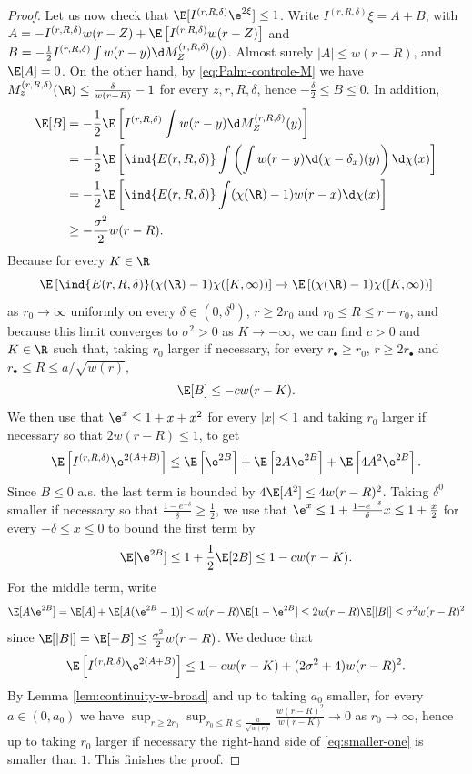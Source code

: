 \documentclass[10pt,a4paper]{article}
\begin{document}
\begin{proof}
Let us now check that $\E[I^{(r,R,\delta)} \e^{2\xi}] \leq 1$. Write $I^{(r,R,\delta)}\xi = A + B$, with $A = -I^{(r,R,\delta)} w(r-Z) + \E\left[I^{(r,R,\delta)} w(r-Z)\right] $ and $B = - \frac{1}{2} I^{(r,R,\delta)} \int w(r-y) \d M_Z^{(r,R,\delta)}(y)$. Almost surely $|A| \leq w(r-R)$, and $\E[A]=0$. On the other hand, by \eqref{eq:Palm-controle-M} we have $M_z^{(r,R,\delta)}(\R) \leq \frac{\delta}{w(r-R)}-1$ for every $z, r, R, \delta$, hence $-\frac\delta 2 \leq B\leq 0$. 
In addition, 
\begin{align*}
\E[B] &= -\frac{1}{2}\E\left[ I^{(r,R,\delta)} \int w(r-y) \d M_Z^{(r,R,\delta)}(y) \right] \\
&= - \frac{1}{2} \E\left[ \ind{E(r,R,\delta)} \int \left(\int w(r-y) \d(\chi-\delta_x)(y)\right) \d\chi(x) \right] \\
&= - \frac{1}{2} \E\left[ \ind{E(r,R,\delta)} \int (\chi(\R)-1) w(r-x) \d\chi(x) \right] \\
&\geq -\frac{\sigma^2}{2}w(r-R) .
\end{align*}
Because for every $K\in\R$
\[ \E\left[ \ind{E(r,R,\delta)} (\chi(\R)-1) \chi([K, \infty)) \right] \to \E\left[ (\chi(\R)-1) \chi([K,\infty)) \right] \]
as $r_0\to\infty$ uniformly on every $\delta \in (0,\delta^0)$, $r\geq 2r_0$ and $r_0 \leq R \leq r-r_0$, and because this limit converges to $\sigma^2>0$ as $K\to-\infty$, we can find $c>0$ and $K\in\R$ such that, taking $r_0$ larger if necessary, for every $r_\bullet \geq r_0$, $r\geq 2r_\bullet$ and $r_\bullet \leq R \leq a/\sqrt{w(r)}$, 
\[ \E[B] \leq - c w(r-K) . \]
We then use that $\e^{x} \leq 1 + x + x^2$ for every $|x|\leq 1$ and taking $r_0$ larger if necessary so that $2w(r-R) \leq 1$, to get
\begin{align*}
\E\left[ I^{(r,R,\delta)} \e^{2(A+B)} \right] \leq \E\left[\e^{2B}\right] + \E\left[2A \e^{2B}\right] + \E\left[4A^2 \e^{2B} \right] .
\end{align*}
Since $B\leq 0$ a.s. the last term is bounded by $4\E[A^2] \leq 4 w(r-R)^2$. Taking $\delta^0$ smaller if necessary so that $\frac{1-e^{-\delta}}{\delta} \geq \frac 12$, we use that $\e^{x} \leq 1 + \frac{1-e^{-\delta}}{\delta} x \leq 1 + \frac{x}{2}$ for every $-\delta \leq x \leq 0$ to bound the first term by
\[ \E[\e^{2B}] \leq 1 + \frac{1}{2} \E[2B] \leq 1 - c w(r-K) . \]
For the middle term, write 
\[ \E[A\e^{2B}] = \E[A] + \E[A(\e^{2B}-1)] \leq w(r-R) \E[1-\e^{2B}] \leq 2w(r-R) \E[|B|] \leq \sigma^2 w(r-R)^2 \]
since $\E[|B|] = \E[-B] \leq \frac{\sigma^2}{2}w(r-R)$. We deduce that
\begin{equation}\label{eq:smaller-one}
\E\left[ I^{(r,R,\delta)} \e^{2(A+B)} \right] \leq 1 - c w(r-K) + (2\sigma^2 + 4) w(r-R)^2 .
\end{equation}
By Lemma \ref{lem:continuity-w-broad} and up to taking $a_0$ smaller, for every $a \in (0,a_0)$ we have $\sup_{r\geq 2r_0} \sup_{r_0\leq R \leq \frac{a}{\sqrt{w(r)}}} \frac{w(r-R)^2}{w(r-K)} \to 0$ as $r_0\to\infty$, 
hence up to taking $r_0$ larger if necessary the right-hand side of \eqref{eq:smaller-one} is smaller than $1$. 
This finishes the proof.
\end{proof}
\end{document}
